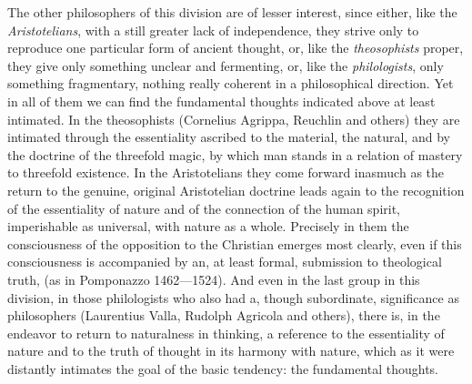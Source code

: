 The other philosophers of this division are of lesser interest, since
either, like the \emph{Aristotelians}, with a still greater lack of
independence, they strive only to reproduce one particular form of
ancient thought, or, like the \emph{theosophists} proper, they give
only something unclear and fermenting, or, like the
\emph{philologists}, only something fragmentary, nothing really
coherent in a philosophical direction. Yet in all of them we can find
the fundamental thoughts indicated above at least intimated. In the
theosophists (Cornelius Agrippa, Reuchlin and others) they are
intimated through the essentiality ascribed to the material, the
natural, and by the doctrine of the threefold magic, by which man
stands in a relation of mastery to threefold existence. In the
Aristotelians they come forward inasmuch as the return to the genuine,
original Aristotelian doctrine leads again to the recognition of the
essentiality of nature and of the connection of the human spirit,
imperishable as universal, with nature as a whole. Precisely in them
the consciousness of the opposition to the Christian emerges most
clearly, even if this consciousness is accompanied by an, at least
formal, submission to theological truth, (as in Pomponazzo
1462---1524).
And even in the last group in this division, in those philologists who
also had a, though subordinate, significance as philosophers
(Laurentius Valla, Rudolph Agricola and others), there is,
in the endeavor to return to naturalness in thinking, a
reference to the essentiality of nature and to the truth of thought in
its harmony with nature, which as it were distantly intimates the goal
of the basic tendency: the fundamental thoughts.

\divrule

